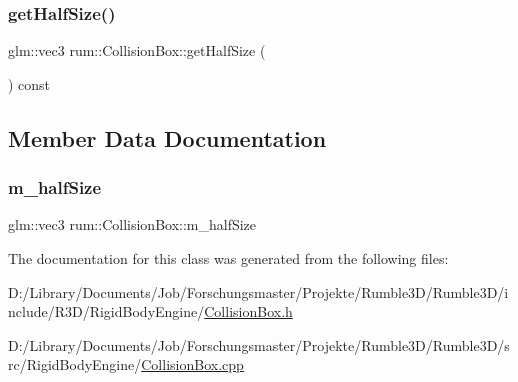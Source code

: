 \subsubsection{\texorpdfstring{get\+Half\+Size()}{getHalfSize()}}
{\footnotesize\ttfamily glm\+::vec3 rum\+::\+Collision\+Box\+::get\+Half\+Size (\begin{DoxyParamCaption}{ }\end{DoxyParamCaption}) const}



\subsection{Member Data Documentation}
\mbox{\label{classrum_1_1_collision_box_ac154420e43adf96a09bd6d1340987bb5}} 
\subsubsection{\texorpdfstring{m\+\_\+half\+Size}{m\_halfSize}}
{\footnotesize\ttfamily glm\+::vec3 rum\+::\+Collision\+Box\+::m\+\_\+half\+Size\hspace{0.3cm}{\ttfamily [protected]}}



The documentation for this class was generated from the following files\+:\begin{DoxyCompactItemize}
\item 
D\+:/\+Library/\+Documents/\+Job/\+Forschungsmaster/\+Projekte/\+Rumble3\+D/\+Rumble3\+D/include/\+R3\+D/\+Rigid\+Body\+Engine/\mbox{\hyperlink{_collision_box_8h}{Collision\+Box.\+h}}\item 
D\+:/\+Library/\+Documents/\+Job/\+Forschungsmaster/\+Projekte/\+Rumble3\+D/\+Rumble3\+D/src/\+Rigid\+Body\+Engine/\mbox{\hyperlink{_collision_box_8cpp}{Collision\+Box.\+cpp}}\end{DoxyCompactItemize}
